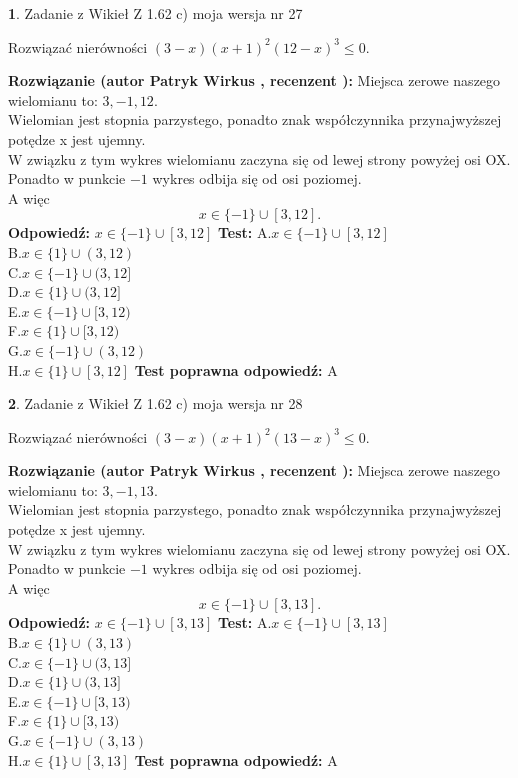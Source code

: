 \documentclass[12pt, a4paper]{article}
\theoremstyle{definition} %
\newtheorem{zad}{}
\newcommand{\zadStart}[1]{\begin{zad}#1\newline}
\newcommand{\zadStop}{\end{zad}}
\newcommand{\rozwStart}[2]{\noindent \textbf{Rozwiązanie (autor #1 , recenzent #2): }\newline}
\newcommand{\rozwStop}{\newline}
\newcommand{\odpStart}{\noindent \textbf{Odpowiedź:}\newline}
\newcommand{\odpStop}{\newline}
\newcommand{\testStart}{\noindent \textbf{Test:}\newline}
\newcommand{\testStop}{\newline}
\newcommand{\kluczStart}{\noindent \textbf{Test poprawna odpowiedź:}\newline}
\newcommand{\kluczStop}{\newline}
\begin{document}
\zadStart{Zadanie z Wikieł Z 1.62 c) moja wersja nr 27}

Rozwiązać nierówności $(3-x)(x+1)^{2}(12-x)^{3}\le0$.
\zadStop
\rozwStart{Patryk Wirkus}{}
Miejsca zerowe naszego wielomianu to: $3, -1, 12$.\\
Wielomian jest stopnia parzystego, ponadto znak współczynnika przy\linebreak najwyższej potędze x jest ujemny.\\ W związku z tym wykres wielomianu zaczyna się od lewej strony powyżej osi OX.\\
Ponadto w punkcie $-1$ wykres odbija się od osi poziomej.\\
A więc $$x \in \{-1\} \cup [3,12].$$
\rozwStop
\odpStart
$x \in \{-1\} \cup [3,12]$
\odpStop
\testStart
A.$x \in \{-1\} \cup [3,12]$\\
B.$x \in \{1\} \cup (3,12)$\\
C.$x \in \{-1\} \cup (3,12]$\\
D.$x \in \{1\} \cup (3,12]$\\
E.$x \in \{-1\} \cup [3,12)$\\
F.$x \in \{1\} \cup [3,12)$\\
G.$x \in \{-1\} \cup (3,12)$\\
H.$x \in \{1\} \cup [3,12]$
\testStop
\kluczStart
A
\kluczStop



\zadStart{Zadanie z Wikieł Z 1.62 c) moja wersja nr 28}

Rozwiązać nierówności $(3-x)(x+1)^{2}(13-x)^{3}\le0$.
\zadStop
\rozwStart{Patryk Wirkus}{}
Miejsca zerowe naszego wielomianu to: $3, -1, 13$.\\
Wielomian jest stopnia parzystego, ponadto znak współczynnika przy\linebreak najwyższej potędze x jest ujemny.\\ W związku z tym wykres wielomianu zaczyna się od lewej strony powyżej osi OX.\\
Ponadto w punkcie $-1$ wykres odbija się od osi poziomej.\\
A więc $$x \in \{-1\} \cup [3,13].$$
\rozwStop
\odpStart
$x \in \{-1\} \cup [3,13]$
\odpStop
\testStart
A.$x \in \{-1\} \cup [3,13]$\\
B.$x \in \{1\} \cup (3,13)$\\
C.$x \in \{-1\} \cup (3,13]$\\
D.$x \in \{1\} \cup (3,13]$\\
E.$x \in \{-1\} \cup [3,13)$\\
F.$x \in \{1\} \cup [3,13)$\\
G.$x \in \{-1\} \cup (3,13)$\\
H.$x \in \{1\} \cup [3,13]$
\testStop
\kluczStart
A
\kluczStop
\end{document}
